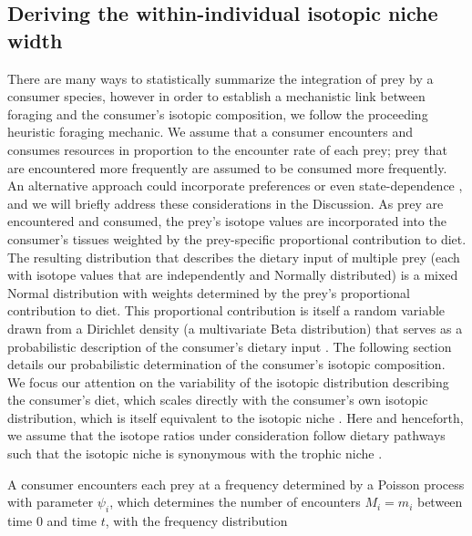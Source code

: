 \documentclass{frontiersSCNS}
\begin{document}
\subsection*{Deriving the within-individual isotopic niche width}
There are many ways to statistically summarize the integration of prey by a consumer species, however in order to establish a mechanistic link between foraging and the consumer's isotopic composition, we follow the proceeding heuristic foraging mechanic.
We assume that a consumer encounters and consumes resources in proportion to the encounter rate of each prey; prey that are encountered more frequently are assumed to be consumed more frequently.
An alternative approach could incorporate preferences \citep{Chesson:1983bt} or even state-dependence \citep{Mangel:1988uaa,Clark:2000tra,Mangel:2014kz}, and we will briefly address these considerations in the Discussion.
As prey are encountered and consumed, the prey's isotope values are incorporated into the consumer's tissues weighted by the prey-specific proportional contribution to diet.
The resulting distribution that describes the dietary input of multiple prey (each with  isotope values that are independently and Normally distributed) is a mixed Normal distribution with weights determined by the prey's proportional contribution to diet.
This proportional contribution is itself a random variable drawn from a Dirichlet density (a multivariate Beta distribution) that serves as a probabilistic description of the consumer's dietary input \citep{Ainsworth:2010uo}.
The following section details our probabilistic determination of the consumer's isotopic composition.
We focus our attention on the variability of the isotopic distribution describing the consumer's diet, which scales directly with the consumer's own isotopic distribution, which is itself equivalent to the isotopic niche \citep{Bearhop:2004im,Newsome:2007tz}.
Here and henceforth, we assume that the isotope ratios under consideration follow dietary pathways such that the isotopic niche is synonymous with the trophic niche \citep{Bearhop:2004im}.


A consumer encounters each prey at a frequency determined by a Poisson process with parameter $\psi_i$, which determines the number of encounters $M_i=m_i$ between time 0 and time $t$, with the frequency distribution
\end{document}
